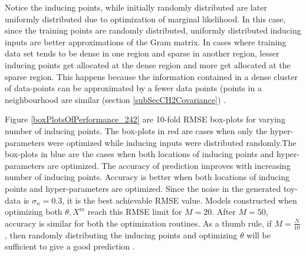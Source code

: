 Notice the inducing points, while initially randomly distributed are later uniformly distributed due to optimization of marginal likelihood. In this case, since the training points are randomly distributed, uniformly distributed inducing inputs are better approximations of the Gram matrix. In cases where training data set tends to be dense in one region and sparse in another region, lesser inducing points get allocated at the dense region and more get allocated at the sparse region. This happens because the information contained in a dense cluster of data-points can be approximated by a fewer data points (points in a neighbourhood are similar (section \ref{subSecCH2Covariance}) \cite{Snelson06sparsegaussian}.

Figure \ref{boxPlotsOfPerformance_242} are 10-fold RMSE box-plots for varying number of inducing points. The box-plots in red are cases when only the hyper-parameters were optimized while inducing inputs were distributed randomly.The box-plots in blue are the cases when both locations of inducing points and hyper-parameters are optimized. The accuracy of prediction improves with increasing number of inducing points. Accuracy is better when both locations of inducing points and hyper-parameters are optimized. Since the noise in the generated toy-data is $\sigma_{n}=0.3$, it is the best achievable RMSE value. Models constructed when optimizing both $\theta, X^{m}$ reach this RMSE limit for $M = 20$. After $M=50$, accuracy is similar for both the optimization routines. As a thumb rule, if $M = \frac{N}{10}$, then randomly distributing the inducing points and optimizing $\theta$ will be sufficient to give a good prediction \cite{cao2013efficient}. 

